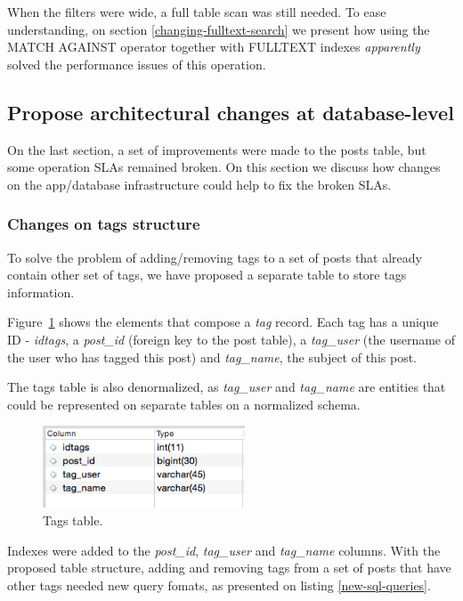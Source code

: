 When the filters were wide, a full table scan was still needed. To ease  understanding, on section \ref{changing-fulltext-search} we present how using the MATCH AGAINST operator together with FULLTEXT indexes \textit{apparently} solved the performance issues of this operation. 














\subsection{Propose architectural changes at database-level}

On the last section, a set of improvements were made to the posts table, but some operation SLAs remained broken. On this section we discuss how changes on the app/database infrastructure could help to fix the broken SLAs.

\subsubsection{Changes on tags structure}
To solve the problem of adding/removing tags to a set of posts that already contain other set of tags, we have proposed a separate table to store tags information. 

Figure~\ref{fig:tagTable} shows the elements that compose a \textit{tag} record. Each tag has a unique ID - \textit{idtags}, a \textit{post\_id} (foreign key to the post table), a \textit{tag\_user} (the username of the user who has tagged this post) and \textit{tag\_name}, the subject of this post. 

The tags table is also denormalized, as \textit{tag\_user} and \textit{tag\_name} are entities that could be represented on separate tables on a normalized schema.

\begin{figure}[ht!]
\centering
\includegraphics[width=60mm]{tagTable.png}
\caption{Tags table.\label{fig:tagTable}}
\end{figure}

Indexes were added to the \textit{post\_id}, \textit{tag\_user} and \textit{tag\_name} columns. With the proposed table structure, adding and removing tags from a set of posts that have other tags needed new query fomats, as presented on listing \ref{new-sql-queries}.

